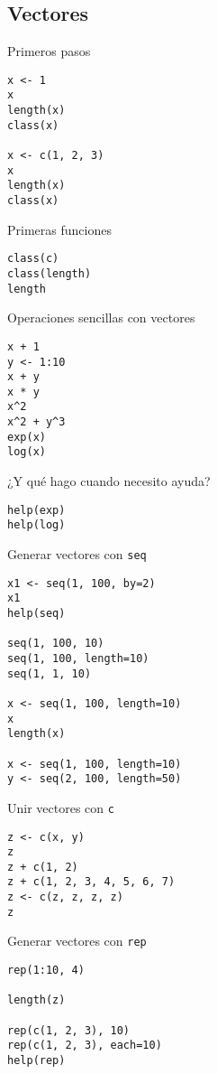 \documentclass[xcolor={usenames,svgnames,dvipsnames}]{beamer}
\begin{document}
\subsection{Vectores}
\label{sec-2-1}
\begin{frame}[fragile,label=sec-2-1-1]{Primeros pasos}
 \lstset{language=R,numbers=none}
\begin{lstlisting}
x <- 1
x
length(x)
class(x)

x <- c(1, 2, 3)
x
length(x)
class(x)
\end{lstlisting}
\end{frame}
\begin{frame}[fragile,label=sec-2-1-2]{Primeras funciones}
 \lstset{language=R,numbers=none}
\begin{lstlisting}
class(c)
class(length)
length
\end{lstlisting}
\end{frame}
\begin{frame}[fragile,label=sec-2-1-3]{Operaciones sencillas con vectores}
 \lstset{language=R,numbers=none}
\begin{lstlisting}
x + 1
y <- 1:10
x + y
x * y
x^2
x^2 + y^3
exp(x)
log(x)
\end{lstlisting}
\end{frame}
\begin{frame}[fragile,label=sec-2-1-4]{¿Y qué hago cuando necesito ayuda?}
 \lstset{language=R,numbers=none}
\begin{lstlisting}
help(exp)
help(log)
\end{lstlisting}
\end{frame}
\begin{frame}[fragile,label=sec-2-1-5]{Generar vectores con \texttt{seq}}
 \lstset{language=R,numbers=none}
\begin{lstlisting}
x1 <- seq(1, 100, by=2)
x1
help(seq)

seq(1, 100, 10)
seq(1, 100, length=10)
seq(1, 1, 10)

x <- seq(1, 100, length=10)
x
length(x)

x <- seq(1, 100, length=10)
y <- seq(2, 100, length=50)
\end{lstlisting}
\end{frame}
\begin{frame}[fragile,label=sec-2-1-6]{Unir vectores con \texttt{c}}
 \lstset{language=R,numbers=none}
\begin{lstlisting}
z <- c(x, y)
z
z + c(1, 2)
z + c(1, 2, 3, 4, 5, 6, 7)
z <- c(z, z, z, z)
z
\end{lstlisting}
\end{frame}
\begin{frame}[fragile,label=sec-2-1-7]{Generar vectores con \texttt{rep}}
 \lstset{language=R,numbers=none}
\begin{lstlisting}
rep(1:10, 4)

length(z)

rep(c(1, 2, 3), 10)
rep(c(1, 2, 3), each=10)
help(rep)
\end{lstlisting}
\end{frame}
\end{document}
